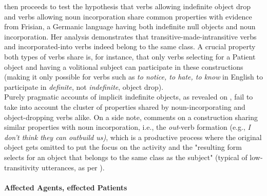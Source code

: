 \textcite[461-463]{Marti2015} then proceeds to test the hypothesis that verbs allowing indefinite object drop and verbs allowing noun incorporation share common properties with evidence from Frisian, a Germanic language having both indefinite null objects and noun incorporation. Her analysis demonstrates that transitive-made-intransitive verbs and incorporated-into verbs indeed belong to the same class. A crucial property both types of verbs share is, for instance, that only verbs selecting for a Patient object and having a volitional subject can participate in these constructions (making it only possible for verbs such as \textit{to notice, to hate, to know} in English to participate in \textit{definite}, not \textit{indefinite}, object drop).\\
Purely pragmatic accounts of implicit indefinite objects, as revealed on , fail to take into account the cluster of properties shared by noun-incorporating and object-dropping verbs alike. On a side note, \textcite[249]{Mittwoch2005} comments on a construction sharing similar properties with noun incorporation, i.e., the \textit{out}-verb formation (e.g., \textit{I don't think they can outbuild us)}, which is a productive process where the original object gets omitted to put the focus on the activity and the "resulting form selects for an object that belongs to the same class as the subject" (typical of low-transitivity utterances, as per \textcite{HopperThompson1980}).


\paragraph{Affected Agents, effected Patients} 

